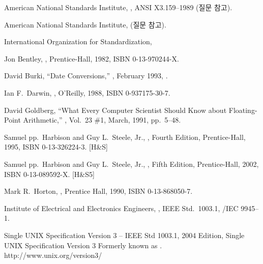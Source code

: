 \begin{thebibliography}{99}

 American National Standards Institute,
	, ANSI X3.159--1989 (질문  참고).

 American National Standards Institute, 
	 (질문  참고).

 International Organization for
        Standardization, 

 Jon Bentley, ,
	Prentice-Hall, 1982, ISBN 0-13-970244-X.

 David Burki, ``Date Conversions,''
	, February 1993, .

 Ian F.\  Darwin, ,
	O'Reilly, 1988, ISBN 0-937175-30-7.

 David Goldberg, 
	``What Every Computer Scientist Should Know about
	Floating-Point Arithmetic,'' , Vol.\  23 \#1,
	March, 1991, pp.\  5--48.

	Samuel pp.\  Harbison and Guy L.\  Steele, Jr., 
	,
	Fourth Edition, Prentice-Hall, 1995, ISBN 0-13-326224-3.   [H\&S]

	Samuel pp.\  Harbison and Guy L.\  Steele, Jr., 
	,
	Fifth Edition, Prentice-Hall, 2002, ISBN 0-13-089592-X.   [H\&S5]

	Mark R.\  Horton, , Prentice Hall, 1990,
	ISBN 0-13-868050-7.

	Institute of Electrical and Electronics Engineers,
	,
	IEEE Std.\  1003.1, \cite{c89}/IEC 9945--1.

	Single UNIX Specification Version 3 --
        IEEE Std 1003.1, 2004 Edition, Single UNIX Specification Version 3
        Formerly known as \cite{posix}. \\
        http://www.unix.org/version3/


\end{thebibliography}
